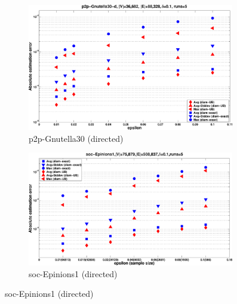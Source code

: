 \begin{figure}[ht]
  \centering
  \begin{subfigure}[b]{0.45\textwidth}
    \includegraphics[width=0.99\textwidth,keepaspectratio]{figures/eps/p2p-Gnutella30-error}
    \caption{p2p-Gnutella30 (directed)}
    \label{fig:gnutella:error}
  \end{subfigure}
  \ifproof
  \hfill
  \begin{subfigure}[b]{0.45\textwidth}
    \includegraphics[width=0.99\textwidth,keepaspectratio]{figures/eps/soc-Epinions1-error}
    \caption{soc-Epinions1 (directed)}
    \label{fig:Epinions:error}
  \end{subfigure}


\end{figure}
